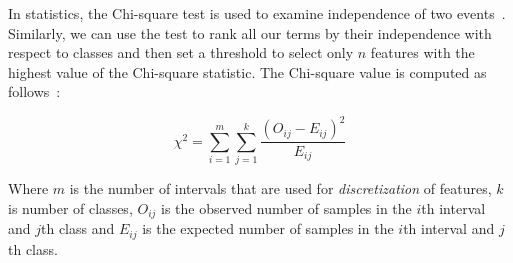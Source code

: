In statistics, the Chi-square test is used to examine independence of two events~\cite{Alenezi2013}. Similarly, we can use the test to rank all our terms by their independence with respect to classes and then set a threshold to select only $n$ features with the highest value of the Chi-square statistic. The Chi-square value is computed as follows~\cite{Alenezi2013}:

$$\chi^2 = \sum_{i=1}^m \sum_{j=1}^k \frac{(O_{ij} - E_{ij})^2}{E_{ij}}$$

Where $m$ is the number of intervals that are used for \textit{discretization} of features, $k$ is number of classes, $O_{ij}$ is the observed number of samples in the $i$th interval and $j$th class and $E_{ij}$ is the expected number of samples in the $i$th interval and $j$th class.